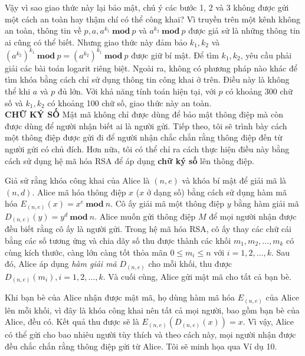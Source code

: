 Vậy vì sao giao thức này lại bảo mật, chú ý các bước 1, 2 và 3 không được gửi một cách an toàn hay thậm chí có thể công khai?
Vì truyền trên một kênh không an toàn, thông tin về $p, a, a^{k_1}\ \mathbf{mod}\ p$ và $a^{k_2}\ \mathbf{mod}\ p$ được giả sử là những thông tin ai cũng có thể biết.
Nhưng giao thức này đảm bảo $k_1,k_2$ và $(a^{k_2})^{k_1}\ \mathbf{mod}\ p = (a^{k_2})^{k_1}\ \mathbf{mod}\ p$ được giữ bí mật.
Để tìm $k_1,k_2$, yêu cầu phải giải các bài toán logarit riêng biệt.
Ngoài ra, không có phương pháp nào khác để tìm khóa
bằng cách chỉ sử dụng thông tin công khai ở trên. Điều này là không thể khi $a$ và $p$ đủ lớn. Vởi khả năng tính toán hiện tại,
với $p$ có khoảng 300 chữ số và $k_1,k_2$ có khoảng 100 chữ số, giao thức này an toàn. \\

\noindent \textcolor{Mycolor}{\textbf{CHỮ KÝ SỐ}} Mật mã không chỉ
được dùng để bảo mật thông điệp mà còn được dùng để
người nhận biết ai là người gửi. Tiếp theo, tôi sẽ trình bày cách một thông điệp được gửi đi để người nhận chắc chắn rằng thông điệp đến từ người gửi có chủ đích.
Hơn nữa, tôi có thể chỉ ra cách thực hiện điều này bằng cách sử dụng hệ mã hóa RSA để áp dụng \textbf{chữ ký số} lên thông điệp.

Giả sử rằng khóa công khai của Alice là $(n, e)$ và khóa bí mật để giải mã là $(n, d)$.
Alice mã hóa thông điệp $x$ ($x$ ở dạng số) bằng cách sử dụng hàm mã hóa $E_{(n, e)}(x) = x^e\ \mathbf{mod}\ n$. Cô ấy
giải mã một thông điệp $y$ bằng hàm giải mã $D_{(n, e)}(y) = y^d\ \mathbf{mod}\ n$. Alice
muốn gửi thông điệp $M$ để mọi người nhận được đều biết rằng cô ấy là người gửi.
Trong hệ mã hóa RSA, cô ấy thay các chữ cái bằng các số tương ứng
và chia dãy số thu được thành các khối $m_1, m_2,\ldots , m_k$ có cùng kích thước, càng lớn càng tốt thỏa mãn $0 \leq m_i \leq n$
với $i = 1, 2, \ldots , k$. Sau đó, Alice áp dụng \textit{hàm giải mã} $D_{(n, e)}$
cho mỗi khối, thu được $D_{(n, e)}(m_i), i = 1, 2,\ldots , k$. Và cuối cùng, Alice gửi mật mã cho
tất cả bạn bè.

Khi bạn bè của Alice nhận được mật mã, họ dùng hàm mã hóa $E_{(n,e)}$ của Alice lên mỗi khối, vì đây là khóa công khai nên tất cả mọi người, bao gồm bạn bè của Alice, đều có.
Kết quả thu được sẽ là $E_{(n,e)}(D_{(n, e)}(x)) = x$.
Vì vậy, Alice có thể gửi cho bao nhiêu người tùy thích và theo cách này, mọi người nhận được đều chắc chắn rằng thông điệp
gửi từ Alice. Tôi sẽ minh họa qua Ví dụ 10.

